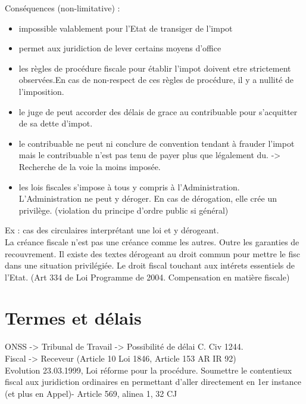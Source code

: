 \documentclass{book}
\begin{document}
Conséquences (non-limitative) :\\

\begin{itemize}
\item impossible valablement pour l'Etat de transiger de l'impot
\item permet aux juridiction de lever certains moyens d'office
\item les règles de procédure fiscale pour établir l'impot doivent etre strictement observées.En cas de non-respect de ces règles de procédure, il y a nullité de l'imposition. 
\item le juge de peut accorder des délais de grace au contribuable pour s'acquitter de sa dette d'impot.
\item le contribuable ne peut ni conclure de convention tendant à frauder l'impot mais le contribuable n'est pas tenu de payer plus que légalement du. -> Recherche de la voie la moins imposée.
\item les lois fiscales s'impose à tous y compris à l'Administration. L'Administration ne peut y déroger. En cas de dérogation, elle crée un privilège. (violation du principe d'ordre public si général)
\end{itemize}

\null 
Ex : cas des circulaires interprétant une loi et y dérogeant.\\


La créance fiscale n'est pas une créance comme les autres. Outre les garanties de recouvrement. Il existe des textes dérogeant au droit commun pour mettre le fisc dans une situation privilégiée. Le droit fiscal touchant aux intérets essentiels de l'Etat. (Art 334 de Loi Programme de 2004. Compensation en matière fiscale)\\


\section{Termes et délais}

ONSS -> Tribunal de Travail -> Possibilité de délai C. Civ 1244.\\

Fiscal -> Receveur (Article 10 Loi 1846, Article 153 AR IR 92) \\

Evolution 23.03.1999, Loi réforme pour la procédure. Soumettre le contentieux fiscal aux juridiction ordinaires en permettant d'aller directement en 1er instance (et plus en Appel)- Article 569, alinea 1, 32 CJ\\
\end{document}
